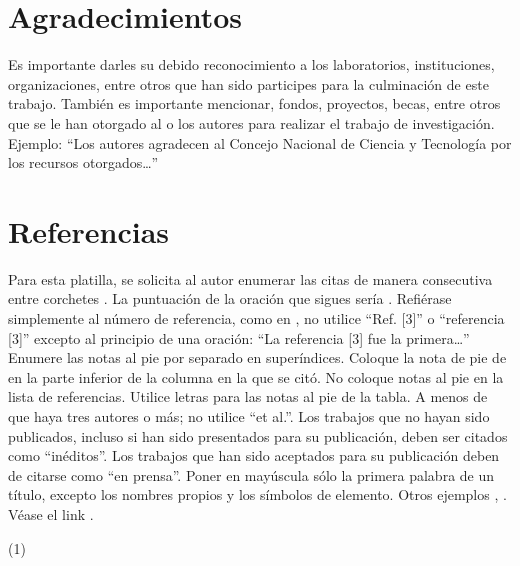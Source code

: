     \section{Agradecimientos}
    
    Es importante darles su debido reconocimiento a los laboratorios, instituciones, organizaciones, entre otros que han sido participes para la culminación de este trabajo. También es importante mencionar, fondos, proyectos, becas, entre otros que se le han otorgado al o los autores para realizar el trabajo de investigación. Ejemplo: “Los autores agradecen al Concejo Nacional de Ciencia y Tecnología por los recursos otorgados…”
    
    \section*{Referencias}
    
    Para esta platilla, se solicita al autor enumerar las citas de manera consecutiva entre corchetes \cite{YLi2013}. 
    La puntuación de la oración que sigues sería \cite{Mesaelides2011}. 
    Refiérase simplemente al número de referencia, como en \cite{Morales2012}, no utilice “Ref. [3]” o “referencia [3]” excepto al principio de una oración: “La referencia [3] fue la primera…”
    Enumere las notas al pie por separado en superíndices. Coloque la nota de pie de en la parte inferior de la columna en la que se citó. No coloque notas al pie en la lista de referencias. Utilice letras para las notas al pie de la tabla.
    A menos de que haya tres autores o más; no utilice “et al.”. Los trabajos que no hayan sido publicados, incluso si han sido presentados para su publicación, deben ser citados como “inéditos”. Los trabajos que han sido aceptados para su publicación deben de citarse como “en prensa”. Poner en mayúscula sólo la primera palabra de un título, excepto los nombres propios y los símbolos de elemento. 
    Otros ejemplos \cite{LAAngeles2021}, \cite{LAAngelesConni}. 
    Véase el link \cite{prueba}.
    
    
    (1) \cite{Niebel}
    
